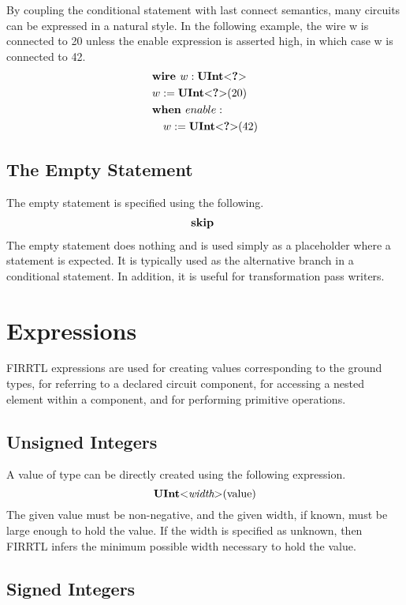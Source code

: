 \documentclass[10pt]{article}
\begin{document}
By coupling the conditional statement with last connect semantics, many circuits can be expressed in a natural style.
In the following example, the wire w is connected to 20 unless the enable expression is asserted high, in which case w is connected to 42. 
\[
\begin{aligned}
&\text{\bf wire\ } w : \text{\bf UInt}\text{\bf $<$} \text{\bf ?} \text{\bf $>$} \\
&w := \text{\bf UInt}\text{\bf $<$} \text{\bf ?} \text{\bf $>$}(20) \\
&\text{\bf when\ } enable : \\
&\quad w := \text{\bf UInt}\text{\bf $<$} \text{\bf ?} \text{\bf $>$}(42) \\
\end{aligned}
\]

\subsection{The Empty Statement}
The empty statement is specified using the following.
\[
\begin{aligned}
\text{\bf skip\ }
\end{aligned}
\]
The empty statement does nothing and is used simply as a placeholder where a statement is expected.
It is typically used as the alternative branch in a conditional statement. 
In addition, it is useful for transformation pass writers.

\section{Expressions}

FIRRTL expressions are used for creating values corresponding to the ground types, for referring to a declared circuit component, for accessing a nested element within a component, and for performing primitive operations. 

\subsection{Unsigned Integers}

A value of type  can be directly created using the following expression.
\[
\text{\bf UInt}\text{\bf $<$} \text{\em width} \text{\bf $>$}(\text{value})
\]
The given value must be non-negative, and the given width, if known, must be large enough to hold the value.
If the width is specified as unknown, then FIRRTL infers the minimum possible width necessary to hold the value.

\subsection{Signed Integers}
\end{document}
